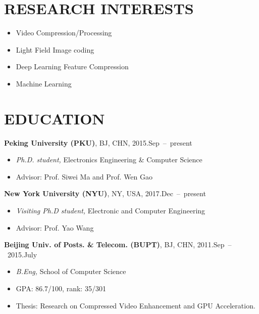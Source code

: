 \documentclass[margin, 10pt]{res} %
\begin{document}
\begin{resume}


\section{RESEARCH INTERESTS}

\begin{itemize} \itemsep -2pt %
\item{Video Compression/Processing}
\item{Light Field Image coding}
\item{Deep Learning Feature Compression}
\item{Machine Learning}
\end{itemize}


\section{EDUCATION}
{\bf Peking University (PKU)}, BJ, CHN, \hfill{ 2015.Sep~--~present}
\begin{itemize} \itemsep -1pt
\item{{\sl Ph.D. student,} Electronics Engineering \& Computer Science}
\item{Advisor: Prof. Siwei Ma and Prof. Wen Gao}
\end{itemize}
{\bf New York University (NYU)}, NY, USA, \hfill{ 2017.Dec~--~present}
\begin{itemize} \itemsep -1pt
\item{{\sl Visiting Ph.D student,} Electronic and Computer Engineering}
\item{Advisor: Prof. Yao Wang}
\end{itemize}
{\bf Beijing Univ. of Posts. \& Telecom. (BUPT)}, BJ, CHN, \hfill{ 2011.Sep~--~2015.July}
\begin{itemize} \itemsep -1pt
\item{{\sl B.Eng,} School of Computer Science}
\item{GPA: 86.7/100, rank: 35/301}
\item{Thesis: Research on Compressed Video Enhancement and GPU Acceleration.}
\end{itemize}



\end{resume}
\end{document}

